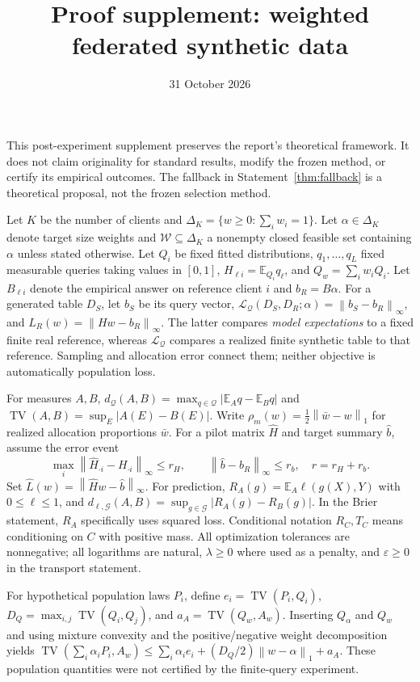 \documentclass[11pt]{article}
\title{Proof supplement: weighted federated synthetic data}
\author{}\date{31 October 2026}
\newcommand{\E}{\mathbb E}\newcommand{\Prb}{\mathbb P}\newcommand{\ind}{\mathbf 1}
\newcommand{\Q}{\mathcal Q}\newcommand{\Z}{\mathcal Z}\newcommand{\W}{\mathcal W}
\newcommand{\TV}{\operatorname{TV}}\newcommand{\KL}{\operatorname{KL}}
\newcommand{\norm}[1]{\left\lVert#1\right\rVert}\newcommand{\qh}{\widehat H}
\newcommand{\bh}{\widehat b}\newcommand{\calL}{\mathcal L}\newcommand{\eps}{\varepsilon}
\begin{document}
\maketitle
This post-experiment supplement preserves the report's theoretical framework. It does not claim originality for standard results, modify the frozen method, or certify its empirical outcomes. The fallback in Statement~\ref{thm:fallback} is a theoretical proposal, not the frozen selection method.

Let $K$ be the number of clients and $\Delta_K=\{w\ge0:\sum_i w_i=1\}$. Let $\alpha\in\Delta_K$ denote target size weights and $\W\subseteq\Delta_K$ a nonempty closed feasible set containing $\alpha$ unless stated otherwise. Let $Q_i$ be fixed fitted distributions, $q_1,\dots,q_L$ fixed measurable queries taking values in $[0,1]$, $H_{\ell i}=\E_{Q_i}q_\ell$, and $Q_w=\sum_i w_i Q_i$. Let $B_{\ell i}$ denote the empirical answer on reference client $i$ and $b_R=B\alpha$. For a generated table $D_S$, let $b_S$ be its query vector, $\calL_\Q(D_S,D_R;\alpha)=\norm{b_S-b_R}_\infty$, and $L_R(w)=\norm{Hw-b_R}_\infty$. The latter compares \emph{model expectations} to a fixed finite real reference, whereas $\calL_\Q$ compares a realized finite synthetic table to that reference. Sampling and allocation error connect them; neither objective is automatically population loss.

For measures $A,B$, $d_\Q(A,B)=\max_{q\in\Q}|\E_Aq-\E_Bq|$ and $\TV(A,B)=\sup_E|A(E)-B(E)|$. Write $\rho_m(w)=\frac12\norm{\bar w-w}_1$ for realized allocation proportions $\bar w$. For a pilot matrix $\qh$ and target summary $\bh$, assume the error event
\begin{equation}\label{eq:errors}
\max_i\norm{\qh_{\cdot i}-H_{\cdot i}}_\infty\le r_H,\qquad \norm{\bh-b_R}_\infty\le r_b,\quad r=r_H+r_b.
\end{equation}
Set $\widehat L(w)=\norm{\qh w-\bh}_\infty$. For prediction, $R_A(g)=\E_A\ell(g(X),Y)$ with $0\le\ell\le1$, and $d_{\ell,\mathcal G}(A,B)=\sup_{g\in\mathcal G}|R_A(g)-R_B(g)|$. In the Brier statement, $R_A$ specifically uses squared loss. Conditional notation $R_C,T_C$ means conditioning on $C$ with positive mass. All optimization tolerances are nonnegative; all logarithms are natural, $\lambda\ge0$ where used as a penalty, and $\eps\ge0$ in the transport statement.

For hypothetical population laws $P_i$, define $e_i=\TV(P_i,Q_i)$, $D_Q=\max_{i,j}\TV(Q_i,Q_j)$, and $a_A=\TV(Q_w,A_w)$. Inserting $Q_\alpha$ and $Q_w$ and using mixture convexity and the positive/negative weight decomposition yields $\TV(\sum_i\alpha_iP_i,A_w)\le\sum_i\alpha_i e_i+(D_Q/2)\norm{w-\alpha}_1+a_A$. These population quantities were not certified by the finite-query experiment.
\end{document}
